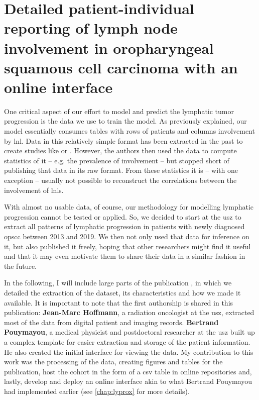 \documentclass[\relativeRoot/main.tex]{subfiles}
\begin{document}
\chapter[Detailed reporting of involvement in OPSCC]{Detailed patient-individual reporting of lymph node involvement in oropharyngeal squamous cell carcinoma with an online interface}
\label{chap:dataset}

One critical aspect of our effort to model and predict the lymphatic tumor progression is the data we use to train the model. As previously explained, our model essentially consumes tables with rows of patients and columns involvement by \gls{lnl}. Data in this relatively simple format has been extracted in the past to create studies like \cite{candela_patterns_1990} or \cite{shah_patterns_1990}. However, the authors then used the data to compute statistics of it -- e.g. the prevalence of involvement -- but stopped short of publishing that data in its raw format. From these statistics it is -- with one exception \cite{sanguineti_defining_2009} -- usually not possible to reconstruct the correlations between the involvement of \glspl{lnl}.

With almost no usable data, of course, our methodology for modelling lymphatic progression cannot be tested or applied. So, we decided to start at the \gls{usz} to extract all patterns of lymphatic progression in patients with newly diagnosed \gls{opscc} between 2013 and 2019. We then not only used that data for inference on it, but also published it freely, hoping that other researchers might find it useful and that it may even motivate them to share their data in a similar fashion in the future.

In the following, I will include large parts of the publication \cite{ludwig_detailed_2022}, in which we detailed the extraction of the dataset, its characteristics and how we made it available. It is important to note that the first authorship is shared in this publication: \textbf{Jean-Marc Hoffmann}, a radiation oncologist at the \gls{usz}, extracted most of the data from digital patient and imaging records. \textbf{Bertrand Pouymayou}, a medical physicist and postdoctoral researcher at the \gls{usz} built up a complex template for easier extraction and storage of the patient information. He also created the initial interface for viewing the data. My contribution to this work was the processing of the data, creating figures and tables for the publication, host the cohort in the form of a \gls{csv} table in online repositories and, lastly, develop and deploy an online interface akin to what Bertrand Pouymayou had implemented earlier (see \cref{chap:lyprox} for more details).







\end{document}
